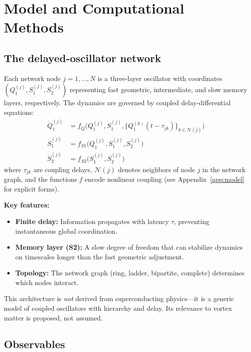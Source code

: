 \documentclass[reprint,aps,prb,superscriptaddress,floatfix]{revtex4-2}
\begin{document}
\section{Model and Computational Methods}

\subsection{The delayed-oscillator network}

Each network node $j = 1, \ldots, N$ is a three-layer oscillator with coordinates $(Q_1^{(j)}, S_1^{(j)}, S_2^{(j)})$ representing fast geometric, intermediate, and slow memory layers, respectively. The dynamics are governed by coupled delay-differential equations:
\begin{align}
\dot{Q}_1^{(j)} &= f_Q\bigl(Q_1^{(j)}, S_1^{(j)}, \{Q_1^{(k)}(t-\tau_{jk})\}_{k \in \mathcal{N}(j)}\bigr) \\
\dot{S}_1^{(j)} &= f_{S1}\bigl(Q_1^{(j)}, S_1^{(j)}, S_2^{(j)}\bigr) \\
\dot{S}_2^{(j)} &= f_{S2}\bigl(S_1^{(j)}, S_2^{(j)}\bigr)
\end{align}
where $\tau_{jk}$ are coupling delays, $\mathcal{N}(j)$ denotes neighbors of node $j$ in the network graph, and the functions $f$ encode nonlinear coupling (see Appendix~\ref{app:model} for explicit forms).

\textbf{Key features:}
\begin{itemize}
\item \textbf{Finite delay:} Information propagates with latency $\tau$, preventing instantaneous global coordination.
\item \textbf{Memory layer (S2):} A slow degree of freedom that can stabilize dynamics on timescales longer than the fast geometric adjustment.
\item \textbf{Topology:} The network graph (ring, ladder, bipartite, complete) determines which nodes interact.
\end{itemize}

This architecture is \emph{not} derived from superconducting physics---it is a generic model of coupled oscillators with hierarchy and delay. Its relevance to vortex matter is proposed, not assumed.

\subsection{Observables}
\end{document}
